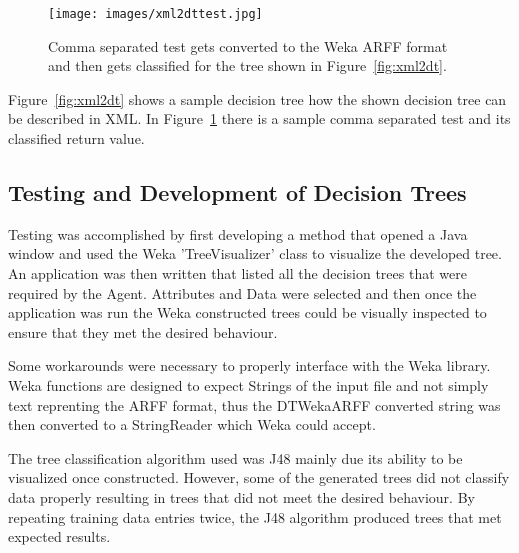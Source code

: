 \begin{figure}[h!]
  \centering  
  \texttt{[image: images/xml2dttest.jpg]}
  \caption{Comma separated test gets converted to the Weka ARFF format and then gets classified for 
  the tree shown in Figure~\ref{fig:xml2dt}.}
  \label{fig:xml2dttest}
\end{figure}

Figure~\ref{fig:xml2dt} shows a sample decision tree how the shown decision tree can be described in XML.  
In Figure~\ref{fig:xml2dttest} there is a sample comma separated test and its classified return value.

\subsection{Testing and Development of Decision Trees}
Testing was accomplished by first developing a method that opened a Java window and used the Weka
'TreeVisualizer' class to visualize the developed tree.  An application was then written that listed
all the decision trees that were required by the Agent.  Attributes and Data were selected and then 
once the application was run the Weka constructed trees could be visually inspected to ensure that
they met the desired behaviour.

Some workarounds were necessary to properly interface with the Weka library.  Weka functions are
designed to expect Strings of the input file and not simply text reprenting the ARFF format, thus
the DTWekaARFF converted string was then converted to a StringReader which Weka could accept.

The tree classification algorithm used was J48 mainly due its ability to be visualized once constructed.
However, some of the generated trees did not classify data properly resulting in trees that did not
meet the desired behaviour.  By repeating training data entries twice, the J48 algorithm produced
trees that met expected results. 